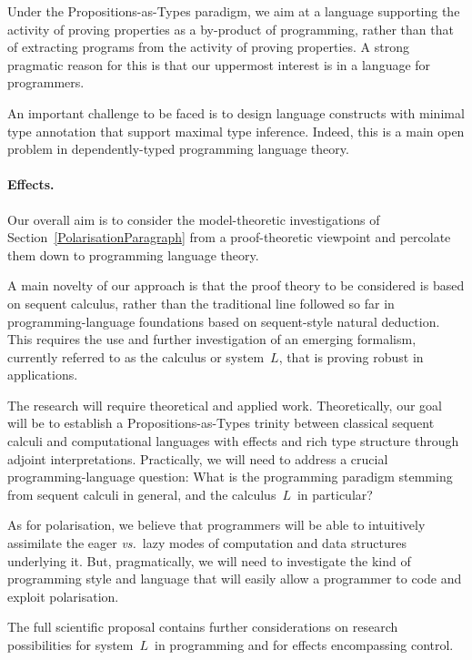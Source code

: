\documentclass[11pt,twocolumn]{article}
\newcommand{\hl}[1]{#1}%
\newcommand{\vs}{\emph{vs.}}
\newcommand{\SysL}{$L$}%
\begin{document}
Under the Propositions-as-Types paradigm, we \hl{aim} at a language
supporting the activity of proving properties as a by-product of programming,
rather than that of extracting programs from the activity of proving
properties.  A strong pragmatic reason for this is that our uppermost interest
is in a language for programmers. 

An important \hl{challenge} to be faced is to design language constructs
with minimal type annotation that support maximal type inference.  Indeed,
this is a main open problem in dependently-typed programming language theory.

\paragraph{Effects.}
\label{ProgrammingEffectsParagraph}

Our overall \hl{aim} is to consider the model-theoretic investigations of
Section~\ref{PolarisationParagraph} from a proof-theoretic viewpoint and
percolate them down to programming language theory.

A main \hl{novelty} of our approach is that the proof theory to be
considered is based on sequent calculus, rather than the traditional line
followed so far in programming-language foundations based on sequent-style
natural deduction.  This requires the use and further investigation of an
emerging formalism, currently referred to as the calculus or system~\SysL,
that is proving robust in applications.

The research will require theoretical and applied work.  Theoretically, our
\hl{goal} will be to establish a Propositions-as-Types trinity between
classical sequent calculi and computational languages with effects and rich
type structure through adjoint interpretations.  Practically, we will need to
address a crucial programming-language \hl{question}:  What is the
programming paradigm stemming from sequent calculi in general, and the
calculus~\SysL\ in particular? 

As for polarisation, we believe that programmers will be able to intuitively
assimilate the eager {\vs}~lazy modes of computation and data structures
underlying it.  But, pragmatically, we will need to \hl{investigate} the
kind of programming style and language that will easily allow a programmer to
code and exploit polarisation.

The full scientific proposal contains further considerations on \hl{research}
possibilities for system~\SysL\ in programming and for effects encompassing
control.
\end{document}
